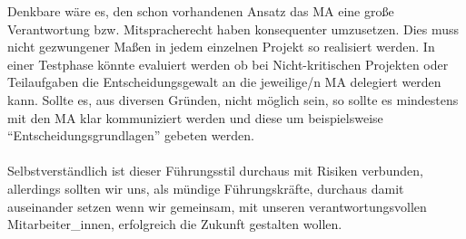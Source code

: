 Denkbare wäre es, den schon vorhandenen Ansatz das \ac{MA} eine große Verantwortung bzw. Mitspracherecht haben konsequenter umzusetzen. 
Dies muss nicht gezwungener Maßen in jedem einzelnen Projekt so realisiert werden. 
In einer Testphase könnte evaluiert werden ob bei Nicht-kritischen Projekten oder Teilaufgaben die Entscheidungsgewalt an die jeweilige/n \ac{MA} delegiert werden kann. 
Sollte es, aus diversen Gründen, nicht möglich sein, so sollte es mindestens mit den \ac{MA} klar kommuniziert werden und diese um beispielsweise "`Entscheidungsgrundlagen"' gebeten werden. \\
\\
Selbstverständlich ist dieser Führungsstil durchaus mit Risiken verbunden, allerdings sollten wir uns, als mündige Führungskräfte, durchaus damit auseinander setzen wenn wir gemeinsam, mit unseren verantwortungsvollen Mitarbeiter\_innen, erfolgreich die Zukunft gestalten wollen.
 

